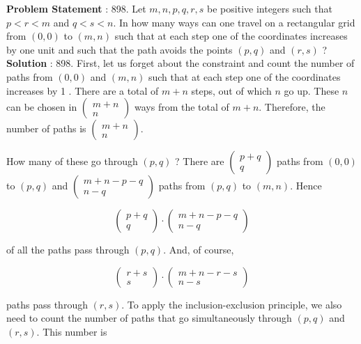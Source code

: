 \documentclass[10pt]{article}
\begin{document}
\textbf{Problem Statement} :
898. Let $m, n, p, q, r, s$ be positive integers such that $p<r<m$ and $q<s<n$. In how many ways can one travel on a rectangular grid from $(0,0)$ to $(m, n)$ such that at each step one of the coordinates increases by one unit and such that the path avoids the points $(p, q)$ and $(r, s)$ ? 
\\
\textbf{Solution} :
898. First, let us forget about the constraint and count the number of paths from $(0,0)$ and $(m, n)$ such that at each step one of the coordinates increases by 1 . There are a total of $m+n$ steps, out of which $n$ go up. These $n$ can be chosen in $\left(\begin{array}{c}m+n \\ n\end{array}\right)$ ways from the total of $m+n$. Therefore, the number of paths is $\left(\begin{array}{c}m+n \\ n\end{array}\right)$.

How many of these go through $(p, q)$ ? There are $\left(\begin{array}{c}p+q \\ q\end{array}\right)$ paths from $(0,0)$ to $(p, q)$ and $\left(\begin{array}{c}m+n-p-q \\ n-q\end{array}\right)$ paths from $(p, q)$ to $(m, n)$. Hence

$$
\left(\begin{array}{c}
p+q \\
q
\end{array}\right) \cdot\left(\begin{array}{c}
m+n-p-q \\
n-q
\end{array}\right)
$$

of all the paths pass through $(p, q)$. And, of course,

$$
\left(\begin{array}{c}
r+s \\
s
\end{array}\right) \cdot\left(\begin{array}{c}
m+n-r-s \\
n-s
\end{array}\right)
$$

paths pass through $(r, s)$. To apply the inclusion-exclusion principle, we also need to count the number of paths that go simultaneously through $(p, q)$ and $(r, s)$. This number is
\end{document}

